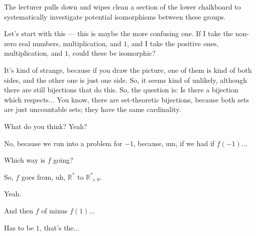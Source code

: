 \begin{note}
The lecturer pulls down and wipes clean a section of the lower chalkboard to systematically investigate potential isomorphisms between these groups.
\end{note}

\begin{speech}[00:15:26 - 00:16:21]
Let's start with this --- this is maybe the more confusing one. If I take the non-zero real numbers, multiplication, and $1$,  and I take the positive ones, multiplication, and $1$,  could these be isomorphic? 

It's kind of strange, because if you draw the picture, one of them is kind of both sides, and the other one is just one side.  So, it seems kind of unlikely, although there are still bijections that do this. So, the question is: Is there a bijection which respects... You know, there are set-theoretic bijections, because both sets are just uncountable sets; they have the same cardinality.

What do you think? Yeah?
\end{speech}

\begin{student}
No, because we run into a problem for $-1$, because, um, if we had if $f(-1)$...
\end{student}

\begin{speech}[00:16:31 - 00:16:33]
Which way is $f$ going?
\end{speech}

\begin{student}
So, $f$ goes from, uh, $\mathbb{R}^*$ to $\mathbb{R}^*_{>0}$.
\end{student}

\begin{speech}[00:16:36 - 00:16:40]
Yeah. 
\end{speech}

\begin{student}
And then $f$ of minus $f(1)$...
\end{student}

\begin{speech}[00:16:42 - 00:16:45]
Has to be $1$, that's the... 
\end{speech}

